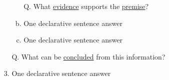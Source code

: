 \documentclass[a4paper, 12pt]{article}
\begin{document}
\begin{CJK*}{UTF8}{bsmi}
\begin{enumerate}[I.]
\begin{enumerate}[A.]
\begin{enumerate}[1.]
\begin{enumerate}[a.]
                                                \item [Q.] What \underline{evidence} supports the \underline{premise}?
                                                \item {\color{gray} One declarative sentence answer} %
                                                \item {\color{gray} One declarative sentence answer} %
                                          \end{enumerate}
                                    \item [Q.] What can be \underline{concluded} from this information?
                                    \item {\color{gray} One declarative sentence answer} %
                              \end{enumerate}
                  \end{enumerate}


\end{enumerate}
\end{CJK*}
\end{document}
